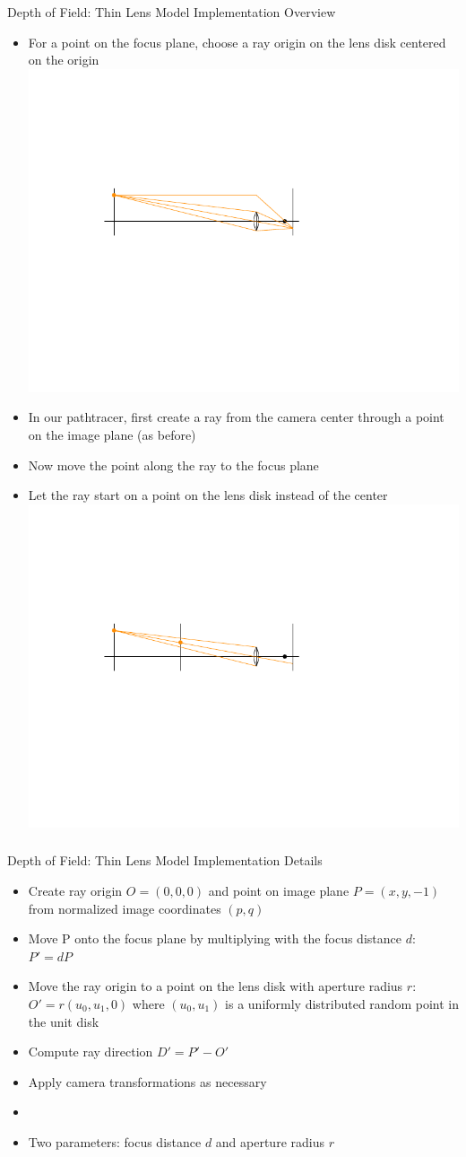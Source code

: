 \documentclass[utf8,stillsansserifmath,fleqn,t]{beamer}
\begin{document}
\begin{frame}
\frametitle{\insertsection}
Depth of Field: Thin Lens Model Implementation Overview
\begin{itemize}
\item For a point on the focus plane, choose a ray origin on the lens disk
centered on the origin\\
\includegraphics[width=.6\textwidth]{./fig/thin-lens-4.pdf}
\item In our pathtracer, first create a ray from the camera center through a point on the image plane (as before)
\item Now move the point along the ray to the focus plane
\item Let the ray start on a point on the lens disk instead of the center
\includegraphics[width=.6\textwidth]{./fig/thin-lens-5.pdf}
\end{itemize}
\end{frame}

\begin{frame}
\frametitle{\insertsection}
Depth of Field: Thin Lens Model Implementation Details
\begin{itemize}
\item Create ray origin $O=(0,0,0)$ and point on image plane $P=(x,y,-1)$
from normalized image coordinates $(p,q)$
\item Move P onto the focus plane by multiplying with the focus distance $d$:
$P'=dP$
\item Move the ray origin to a point on the lens disk with aperture radius $r$:
$O'=r(u_0,u_1,0)$ where $(u_0,u_1)$ is a uniformly distributed random point in the
unit disk
\item Compute ray direction $D'=P'-O'$
\item Apply camera transformations as necessary
\item[~]
\item Two parameters: focus distance $d$ and aperture radius $r$
\end{itemize}
\end{frame}
\end{document}
